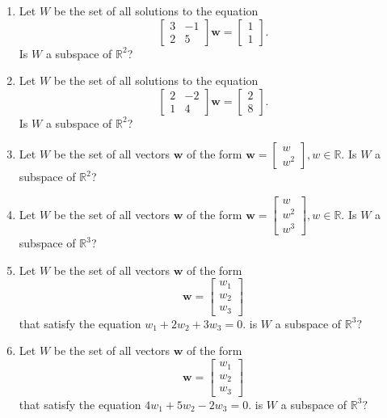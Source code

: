 \documentclass[
]{book}
\theoremstyle{definition}
\theoremstyle{definition}
\theoremstyle{definition}
\theoremstyle{definition}
\theoremstyle{remark}
\begin{document}
\begin{enumerate}
\def\labelenumi{\arabic{enumi}.}
\setcounter{enumi}{6}
\item
  Let \(W\) be the set of all solutions to the equation
  \[\begin{bmatrix} 3 & -1\\2 & 5\end{bmatrix}\mathbf{w}=\begin{bmatrix}1\\1\end{bmatrix}.\]
  Is \(W\) a subspace of \(\mathbb{R}^2\)?
\item
  Let \(W\) be the set of all solutions to the equation
  \[\begin{bmatrix} 2 & -2\\1 & 4\end{bmatrix}\mathbf{w}=\begin{bmatrix}2\\8\end{bmatrix}.\]
  Is \(W\) a subspace of \(\mathbb{R}^2\)?
\item
  Let \(W\) be the set of all vectors \(\mathbf{w}\) of the form \(\mathbf{w}=\begin{bmatrix}w\\w^2\end{bmatrix}, w\in \mathbb{R}.\) Is \(W\) a subspace of \(\mathbb{R}^2\)?
\item
  Let \(W\) be the set of all vectors \(\mathbf{w}\) of the form \(\mathbf{w}=\begin{bmatrix}w\\w^2\\w^3\end{bmatrix}, w\in \mathbb{R}.\) Is \(W\) a subspace of \(\mathbb{R}^3\)?
\item
  Let \(W\) be the set of all vectors \(\mathbf{w}\) of the form
  \[\mathbf{w}=\begin{bmatrix}w_1\\w_2\\w_3\end{bmatrix}\]
  that satisfy the equation \(w_1+2w_2+3w_3=0.\) is \(W\) a subspace of \(\mathbb{R}^3?\)
\item
  Let \(W\) be the set of all vectors \(\mathbf{w}\) of the form
  \[\mathbf{w}=\begin{bmatrix}w_1\\w_2\\w_3\end{bmatrix}\]
  that satisfy the equation \(4w_1+5w_2-2w_3=0.\) is \(W\) a subspace of \(\mathbb{R}^3?\)

\end{enumerate}
\end{document}

